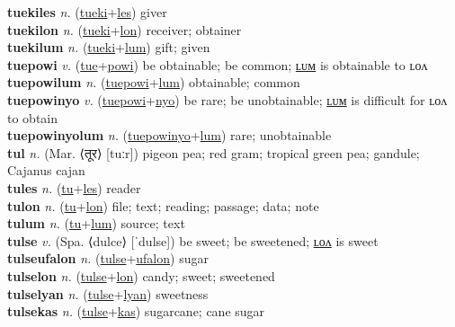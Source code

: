 \textbf{tuekiles} \textit{n.} (\hyperref[tueki]{tueki}+\hyperref[les]{les})
giver \label{tuekiles} \\
\textbf{tuekilon} \textit{n.} (\hyperref[tueki]{tueki}+\hyperref[lon]{lon})
receiver; obtainer \label{tuekilon} \\
\textbf{tuekilum} \textit{n.} (\hyperref[tueki]{tueki}+\hyperref[lum]{lum})
gift; given \label{tuekilum} \\
\textbf{tuepowi} \textit{v.} (\hyperref[tue]{tue}+\hyperref[powi]{powi})
be obtainable; be common; \hyperref[tuepowilum]{ʟᴜᴍ} is obtainable to ʟᴏᴧ \label{tuepowi} \\
\textbf{tuepowilum} \textit{n.} (\hyperref[tuepowi]{tuepowi}+\hyperref[lum]{lum})
obtainable; common \label{tuepowilum} \\
\textbf{tuepowinyo} \textit{v.} (\hyperref[tuepowi]{tuepowi}+\hyperref[nyo]{nyo})
be rare; be unobtainable; \hyperref[tuepowinyolum]{ʟᴜᴍ} is difficult for ʟᴏᴧ to obtain \label{tuepowinyo} \\
\textbf{tuepowinyolum} \textit{n.} (\hyperref[tuepowinyo]{tuepowinyo}+\hyperref[lum]{lum})
rare; unobtainable \label{tuepowinyolum} \\
\textbf{tul} \textit{n.} (Mar. ⟨तूर⟩ [tuːr])
pigeon pea; red gram; tropical green pea; gandule; Cajanus cajan \label{tul} \\
\textbf{tules} \textit{n.} (\hyperref[tu]{tu}+\hyperref[les]{les})
reader \label{tules} \\
\textbf{tulon} \textit{n.} (\hyperref[tu]{tu}+\hyperref[lon]{lon})
file; text; reading; passage; data; note \label{tulon} \\
\textbf{tulum} \textit{n.} (\hyperref[tu]{tu}+\hyperref[lum]{lum})
source; text \label{tulum} \\
\textbf{tulse} \textit{v.} (Spa. ⟨dulce⟩ [ˈdulse])
be sweet; be sweetened; \hyperref[tulselon]{ʟᴏᴧ} is sweet \label{tulse} \\
\textbf{tulseufalon} \textit{n.} (\hyperref[tulse]{tulse}+\hyperref[ufalon]{ufalon})
sugar \label{tulseufalon} \\
\textbf{tulselon} \textit{n.} (\hyperref[tulse]{tulse}+\hyperref[lon]{lon})
candy; sweet; sweetened \label{tulselon} \\
\textbf{tulselyan} \textit{n.} (\hyperref[tulse]{tulse}+\hyperref[lyan]{lyan})
sweetness \label{tulselyan} \\
\textbf{tulsekas} \textit{n.} (\hyperref[tulse]{tulse}+\hyperref[kas]{kas})
sugarcane; cane sugar \label{tulsekas} \\
